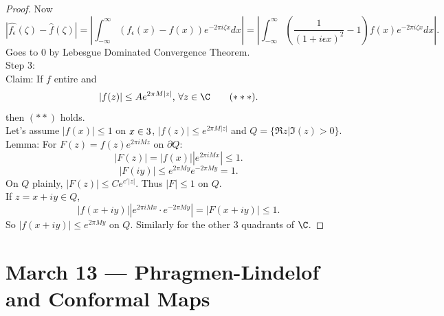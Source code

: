 \documentclass[a4paper]{article}
\begin{document}
\begin{proof}
    Now 
    \[
    \left |\hat{f_\epsilon}(\zeta)-\hat{f}(\zeta) \right |=\left |\int_{-\infty}^{\infty}(f_\epsilon(x)-f(x))e^{-2\pi i \zeta x}dx \right |=\left |\int_{-\infty}^{\infty} \left( \frac{1}{(1+i\epsilon x)^2}-1 \right)f(x)e^{-2\pi i \zeta x}dx \right |
    .\] 
    Goes to $0$ by Lebesgue Dominated Convergence Theorem.\\
    Step 3: \\
    Claim: If $f$ entire and 
    \[
    |f(z)|\leq A e^{2\pi M |z|} \text{, } \forall z\in \C \tag{$***$} 
    .\] 
    then $(**)$ holds. \\
    Let's assume $|f(x)|\leq 1$ on $x\in 3$, $|f(z)|\leq e^{2\pi M |z|}$ and $Q= \{\Re z| \Im(z)>0\}$. 
    Lemma: For $F(z)=f(z)e^{ 2\pi i M z}$ on $\partial Q$: 
    \[
    |F(z)|=|f(x)||e^{2\pi i Mx}|\leq 1
    .\] 
    \[
    |F(iy)|\leq e^{2\pi M y}e^{-2\pi M y}=1
    .\] 
    On $Q$ plainly, $|F(z)|\leq Ce^{c'|z|}$. Thus $|F|\leq 1$ on $Q$. \\
    If $z=x+iy\in Q$, 
    \[
        |f(x+iy)||e^{2\pi i M x}\cdot e^{-2\pi M y}|=|F(x+iy)|\leq 1
    .\]
    So $|f(x+iy)|\leq e^{2\pi M y}$ on $Q$. Similarly for the other $3$ quadrants of $\C$. 
\end{proof}
\newpage
\section{March 13 --- Phragmen-Lindelof and Conformal Maps}
\end{document}
